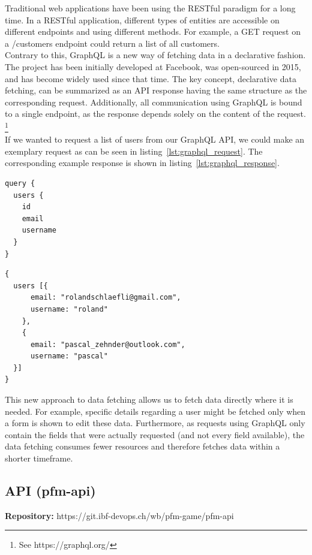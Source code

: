 Traditional web applications have been using the RESTful paradigm for a long time. In a RESTful application, different types of entities are accessible on different endpoints and using different methods. For example, a GET request on a /customers endpoint could return a list of all customers.\\

Contrary to this, GraphQL is a new way of fetching data in a declarative fashion. The project has been initially developed at Facebook, was open-sourced in 2015, and has become widely used since that time. The key concept, declarative data fetching, can be summarized as an API response having the same structure as the corresponding request. Additionally, all communication using GraphQL is bound to a single endpoint, as the response depends solely on the content of the request. \footnote{See https://graphql.org/}\\

If we wanted to request a list of users from our GraphQL API, we could make an exemplary request as can be seen in listing~\ref{lst:graphql_request}. The corresponding example response is shown in listing~\ref{lst:graphql_response}.

\begin{multicols}{2}
  \vspace*{\fill}
  \begin{lstlisting}[caption=GraphQL request, label=lst:graphql_request]
query {
  users {
    id
    email
    username
  }
}
  \end{lstlisting}
  \columnbreak
  \begin{lstlisting}[caption=GraphQL response, label=lst:graphql_response]
{
  users [{
      email: "rolandschlaefli@gmail.com",
      username: "roland"
    },
    {
      email: "pascal_zehnder@outlook.com",
      username: "pascal"
  }]
}
  \end{lstlisting}
\end{multicols}

This new approach to data fetching allows us to fetch data directly where it is needed. For example, specific details regarding a user might be fetched only when a form is shown to edit these data. Furthermore, as requests using GraphQL only contain the fields that were actually requested (and not every field available), the data fetching consumes fewer resources and therefore fetches data within a shorter timeframe.


\subsection{API (pfm-api)}
\begin{flushright}
  \textbf{Repository:} https://git.ibf-devops.ch/wb/pfm-game/pfm-api
\end{flushright}


